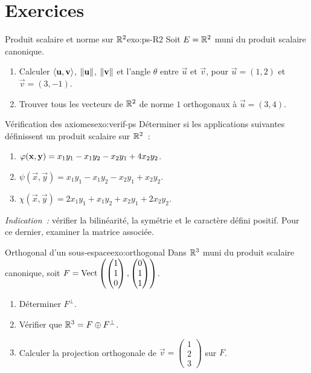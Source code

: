 \section{Exercices}\label{sec:exos-ps}

\begin{exercise}{\basic{} Produit scalaire et norme sur ${\mathbb{R}}^2$}{exo:ps-R2}
  Soit $E={\mathbb{R}}^2$ muni du produit scalaire canonique.
  \begin{enumerate}[label=(\alph*)]
    \item Calculer $\langle\mathbf{u},\mathbf{v}\rangle$, $\lVert\mathbf{u}\rVert$,
      $\lVert\mathbf{v}\rVert$ et l'angle $\theta$ entre $\vec{u}$ et $\vec{v}$,
      pour $\vec{u}=(1,2)$ et $\vec{v}=(3,-1)$.
    \item Trouver tous les vecteurs de ${\mathbb{R}}^2$ de norme $1$ orthogonaux
      à $\vec{u}=(3,4)$.
  \end{enumerate}
\end{exercise}

\begin{exercise}{\basic{} Vérification des axiomes}{exo:verif-ps}
  Déterminer si les applications suivantes définissent un produit
  scalaire sur ${\mathbb{R}}^2$~:
  \begin{enumerate}[label=(\alph*)]
    \item $\varphi(\mathbf{x},\mathbf{y})=x_1 y_1-x_1 y_2-x_2 y_1+4x_2 y_2$.
    \item $\psi(\vec{x},\vec{y})=x_1 y_1-x_1 y_2-x_2 y_1+x_2 y_2$.
    \item $\chi(\vec{x},\vec{y})=2x_1 y_1+x_1 y_2+x_2 y_1+2x_2 y_2$.
  \end{enumerate}
  \emph{Indication~:} vérifier la bilinéarité, la symétrie et le
  caractère défini positif. Pour ce dernier, examiner la matrice
  associée.
\end{exercise}

\begin{exercise}{\basic{} Orthogonal d'un sous-espace}{exo:orthogonal}
  Dans ${\mathbb{R}}^3$ muni du produit scalaire canonique, soit
  $F=\operatorname{Vect}\left(\begin{pmatrix}1\\1\\0\end{pmatrix},
  \begin{pmatrix}0\\1\\1\end{pmatrix}\right)$.
  \begin{enumerate}[label=(\alph*)]
    \item Déterminer $F^\perp$.
    \item Vérifier que ${\mathbb{R}}^3=F\oplus F^\perp$.
    \item Calculer la projection orthogonale de
      $\vec{v}=\begin{pmatrix}1\\2\\3\end{pmatrix}$ sur $F$.
  \end{enumerate}
\end{exercise}

